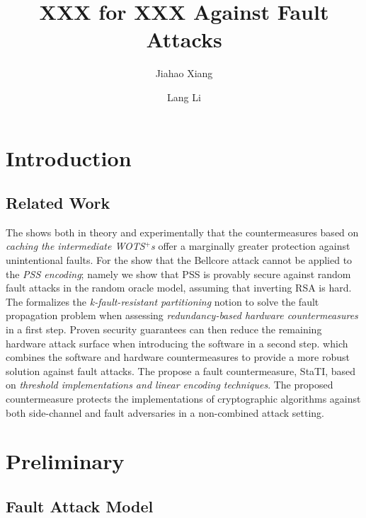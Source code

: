 \documentclass[journal=tches,final]{iacrtrans}
\author{Jiahao Xiang\inst{1} \and Lang Li\inst{1}}
\institute{
  Hengyang Normal University, College of Computer Science and Technology, Hengyang, China
}
\title{ XXX for XXX Against Fault Attacks}
\begin{document}
\maketitle




\begin{abstract}

\end{abstract}


\section{Introduction}

\subsection{Related Work}

The \cite{TCHES:Genet23} shows both in theory and experimentally that the countermeasures based on \textit{caching the intermediate
WOTS$^{+}$s} offer a marginally greater protection against unintentional faults. 
For the \cite{AC:CorMan09} show that the Bellcore attack cannot be applied to the \textit{PSS encoding}; namely we show that PSS is provably secure against random fault attacks in the random oracle model, assuming that inverting RSA is hard. 
The \cite{TCHES:THNABC24}  formalizes the \textit{k-fault-resistant partitioning} notion to solve the fault propagation problem when assessing \textit{redundancy-based hardware countermeasures} in a first step. Proven security guarantees can then reduce the remaining hardware attack surface when introducing the software in a second step. which combines the software and hardware countermeasures to provide a more robust solution against fault attacks. 
The \cite{TCHES:DhoOvcTop24} propose a fault countermeasure, StaTI, based on \textit{threshold implementations and linear encoding techniques}. The proposed countermeasure protects the implementations of cryptographic algorithms against both side-channel and fault adversaries in a non-combined attack setting.


\section{Preliminary}

\subsection{Fault Attack Model}
\end{document}
